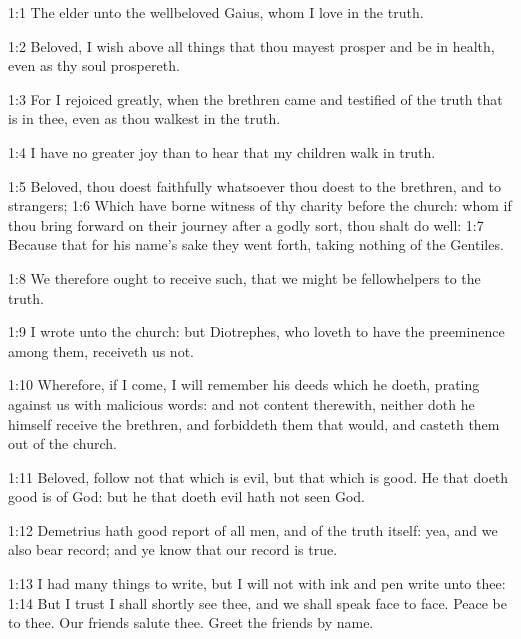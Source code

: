 

1:1 The elder unto the wellbeloved Gaius, whom I love in the truth.

1:2 Beloved, I wish above all things that thou mayest prosper and be in health, even as thy soul prospereth.

1:3 For I rejoiced greatly, when the brethren came and testified of the truth that is in thee, even as thou walkest in the truth.

1:4 I have no greater joy than to hear that my children walk in truth.

1:5 Beloved, thou doest faithfully whatsoever thou doest to the brethren, and to strangers; 1:6 Which have borne witness of thy charity before the church: whom if thou bring forward on their journey after a godly sort, thou shalt do well: 1:7 Because that for his name's sake they went forth, taking nothing of the Gentiles.

1:8 We therefore ought to receive such, that we might be fellowhelpers to the truth.

1:9 I wrote unto the church: but Diotrephes, who loveth to have the preeminence among them, receiveth us not.

1:10 Wherefore, if I come, I will remember his deeds which he doeth, prating against us with malicious words: and not content therewith, neither doth he himself receive the brethren, and forbiddeth them that would, and casteth them out of the church.

1:11 Beloved, follow not that which is evil, but that which is good.  He that doeth good is of God: but he that doeth evil hath not seen God.

1:12 Demetrius hath good report of all men, and of the truth itself: yea, and we also bear record; and ye know that our record is true.

1:13 I had many things to write, but I will not with ink and pen write unto thee: 1:14 But I trust I shall shortly see thee, and we shall speak face to face. Peace be to thee. Our friends salute thee. Greet the friends by name.

